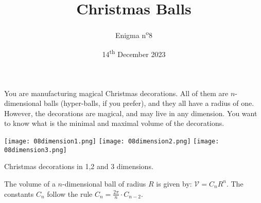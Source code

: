 \documentclass[a4paper, top=10mm]{article}
\title{\textbf{\huge{Christmas Balls}}}
\author{Enigma n\textsuperscript{o}8}
\date{14\textsuperscript{th} December 2023}
\begin{document}
	\maketitle
	
	You are manufacturing magical Christmas decorations.
	All of them  are $n$-dimensional balls (hyper-balls, if you prefer), and they all have a radius of one.
	However, the decorations are magical, and may live in any dimension.
	You want to know what is the minimal and maximal volume of the decorations.
	
	\begin{center}
		\texttt{[image: 08dimension1.png]}	\texttt{[image: 08dimension2.png]}		\texttt{[image: 08dimension3.png]}
		
		Christmas decorations in 1,2 and 3 dimensions.
	\end{center}
	
	The volume of a $n$-dimensional ball of radius $R$ is given by: $\mathcal{V} = C_n R^n$.
	The constants $C_n$ follow the rule $C_n = \frac{2\pi}{n} \cdot C_{n-2}$.
	
	
\end{document}
